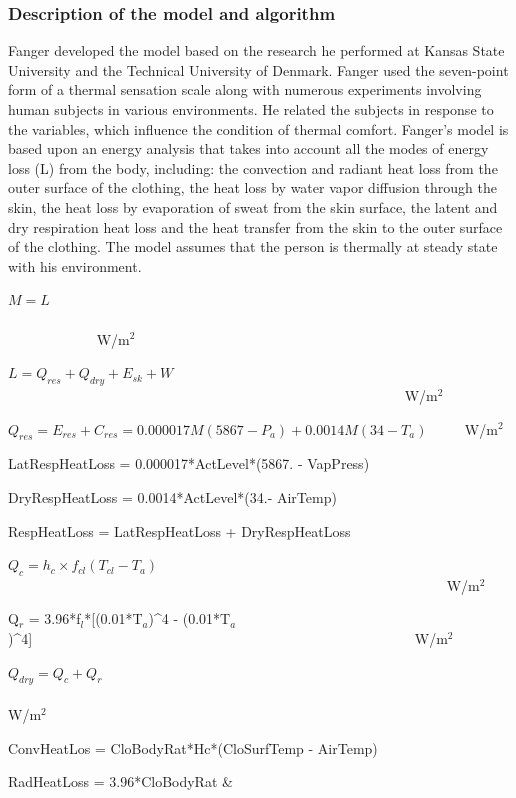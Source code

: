 \subsubsection{Description of the model and algorithm}\label{description-of-the-model-and-algorithm}

Fanger developed the model based on the research he performed at Kansas State University and the Technical University of Denmark. Fanger used the seven-point form of a thermal sensation scale along with numerous experiments involving human subjects in various environments. He related the subjects in response to the variables, which influence the condition of thermal comfort. Fanger's model is based upon an energy analysis that takes into account all the modes of energy loss (L) from the body, including: the convection and radiant heat loss from the outer surface of the clothing, the heat loss by water vapor diffusion through the skin, the heat loss by evaporation of sweat from the skin surface, the latent and dry respiration heat loss and the heat transfer from the skin to the outer surface of the clothing. The model assumes that the person is thermally at steady state with his environment.

\(M = L\) ~~~~~~~~~~~~~~~~~~~~~~~~~~~~~~~~~~~~~~~~~~~~~~~~~~~~~~~~~~~~~~~~~~~~~~~~~~~~~~~~~~~~ W/m\(^{2}\)

\(L = {Q_{res}} + {Q_{dry}} + {E_{sk}} + W\) ~~~~~~~~~~~~~~~~~~~~~~~~~~~~~~~~~~~~~~~~~~~~~~~~~~~~~~~~ W/m\(^{2}\)

\({Q_{res}} = {E_{res}} + {C_{res}} = 0.000017M(5867 - {P_a}) + 0.0014M(34 - {T_a})\) ~~~~ W/m\(^{2}\)

LatRespHeatLoss = 0.000017*ActLevel*(5867. - VapPress)

DryRespHeatLoss = 0.0014*ActLevel*(34.- AirTemp)

RespHeatLoss = LatRespHeatLoss + DryRespHeatLoss

\({Q_c} = {h_c} \times {f_{cl}}({T_{cl}} - {T_a})\) ~~~~~~~~~~~~~~~~~~~~~~~~~~~~~~~~~~~~~~~~~~~~~~~~~~~~~~~~~~~~~~ W/m\(^{2}\) 

{Q\(_{r}\) = 3.96*f\(_{l}\)*{[}(0.01*T\(_{a}\))\^{}4 - (0.01*T\(_{a}\))\^{}4{]}}~~~~~~~~~~~~~~~~~~~~~~~~~~~~~~~~~~~~~~~~~~~~~~~~~~~~~~ W/m\(^{2}\)

\({Q_{dry}} = {Q_c} + {Q_r}\) ~~~~~~~~~~~~~~~~~~~~~~~~~~~~~~~~~~~~~~~~~~~~~~~~~~~~~~~~~~~~~~~~~~~~~~~~ W/m\(^{2}\)

ConvHeatLos = CloBodyRat*Hc*(CloSurfTemp - AirTemp)

RadHeatLoss = 3.96*CloBodyRat \&

